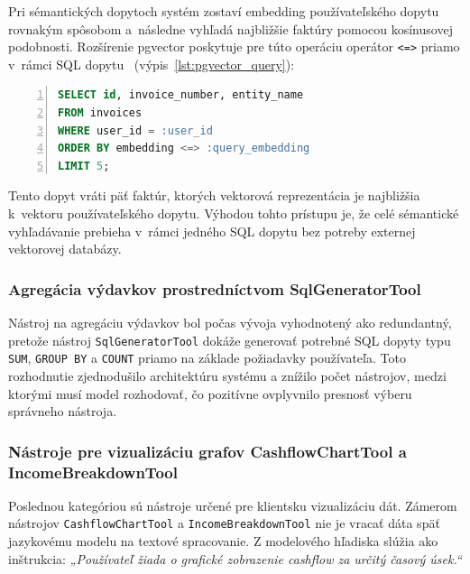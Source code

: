 Pri sémantických dopytoch systém zostaví embedding používateľského dopytu rovnakým
spôsobom a~následne vyhľadá najbližšie faktúry pomocou kosínusovej podobnosti.
Rozšírenie pgvector poskytuje pre túto operáciu operátor \texttt{<=>} priamo v~rámci
SQL dopytu~\cite{pgvector2023} (výpis~\ref{lst:pgvector_query}):

\vspace{1\baselineskip}
\begin{lstlisting}[language=SQL,
    caption={Vyhľadanie sémanticky podobných faktúr pomocou pgvector},
    label={lst:pgvector_query},
    basicstyle=\ttfamily\small,
    keywordstyle=\color{blue},
    commentstyle=\color{gray},
    stringstyle=\color{red!70!black},
    numbers=left,
    numberstyle=\tiny\color{gray},
    breaklines=true,
    frame=single
]
SELECT id, invoice_number, entity_name
FROM invoices
WHERE user_id = :user_id
ORDER BY embedding <=> :query_embedding
LIMIT 5;
\end{lstlisting}

Tento dopyt vráti päť faktúr, ktorých vektorová reprezentácia je najbližšia k~vektoru
používateľského dopytu. Výhodou tohto prístupu je, že celé sémantické vyhľadávanie
prebieha v~rámci jedného SQL dopytu bez potreby externej vektorovej databázy.

\subsubsection{Agregácia výdavkov prostredníctvom SqlGeneratorTool}
Nástroj na agregáciu výdavkov bol počas vývoja vyhodnotený ako redundantný,
pretože nástroj \texttt{SqlGeneratorTool} dokáže generovať potrebné SQL dopyty typu
\texttt{SUM}, \texttt{GROUP BY} a \texttt{COUNT} priamo na základe požiadavky používateľa.
Toto rozhodnutie zjednodušilo architektúru systému a znížilo počet nástrojov, medzi
ktorými musí model rozhodovať, čo pozitívne ovplyvnilo presnosť výberu správneho
nástroja.

\subsubsection{Nástroje pre vizualizáciu grafov CashflowChartTool a
IncomeBreakdownTool}
Poslednou kategóriou sú nástroje určené pre klientsku vizualizáciu dát. Zámerom nástrojov
\texttt{CashflowChartTool} a \texttt{IncomeBreakdownTool} nie je vracať dáta späť
jazykovému modelu na textové spracovanie. Z modelového hľadiska slúžia ako
inštrukcia: \textit{„Používateľ žiada o grafické zobrazenie cashflow za určitý
časový úsek.“}

